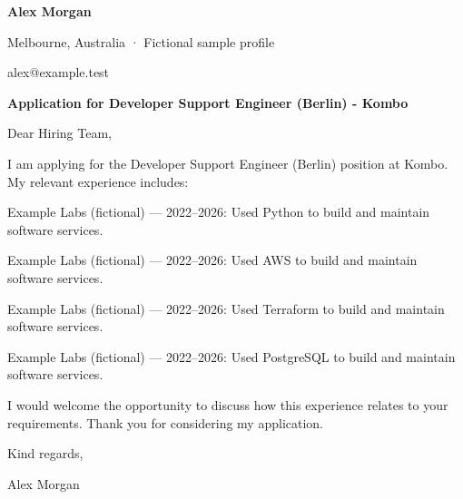 \documentclass[10pt,a4paper]{article}
\begin{document}
{\LARGE\bfseries\color{navy} Alex Morgan}\par
Melbourne, Australia · Fictional sample profile\par
alex@example.test\par
{\large\bfseries\color{navy} Application for Developer Support Engineer (Berlin) - Kombo}\par
Dear Hiring Team,\par
I am applying for the Developer Support Engineer (Berlin) position at Kombo. My relevant experience includes:\par
Example Labs (fictional) — 2022–2026: Used Python to build and maintain software services.\par
Example Labs (fictional) — 2022–2026: Used AWS to build and maintain software services.\par
Example Labs (fictional) — 2022–2026: Used Terraform to build and maintain software services.\par
Example Labs (fictional) — 2022–2026: Used PostgreSQL to build and maintain software services.\par
I would welcome the opportunity to discuss how this experience relates to your requirements. Thank you for considering my application.\par
Kind regards,\par
Alex Morgan\par
\end{document}
